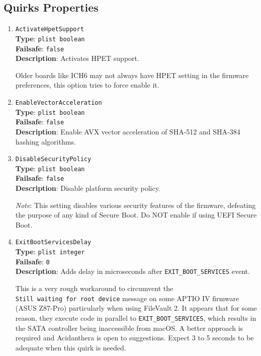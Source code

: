 \documentclass[]{article}
\begin{document}
\subsection{Quirks Properties}\label{uefiquirkprops}

\begin{enumerate}

\item
  \texttt{ActivateHpetSupport}\\
  \textbf{Type}: \texttt{plist\ boolean}\\
  \textbf{Failsafe}: \texttt{false}\\
  \textbf{Description}: Activates HPET support.

  Older boards like ICH6 may not always have HPET setting in the firmware preferences,
  this option tries to force enable it.

  \item
  \texttt{EnableVectorAcceleration}\\
  \textbf{Type}: \texttt{plist\ boolean}\\
  \textbf{Failsafe}: \texttt{false}\\
  \textbf{Description}: Enable AVX vector acceleration of SHA-512 and SHA-384 hashing algorithms.

  \item
  \texttt{DisableSecurityPolicy}\\
  \textbf{Type}: \texttt{plist\ boolean}\\
  \textbf{Failsafe}: \texttt{false}\\
  \textbf{Description}: Disable platform security policy.

  \emph{Note}: This setting disables various security features of the firmware,
  defeating the purpose of any kind of Secure Boot. Do NOT enable if using
  UEFI Secure Boot.

\item
  \texttt{ExitBootServicesDelay}\\
  \textbf{Type}: \texttt{plist\ integer}\\
  \textbf{Failsafe}: \texttt{0}\\
  \textbf{Description}: Adds delay in microseconds after \texttt{EXIT\_BOOT\_SERVICES}
  event.

  This is a very rough workaround to circumvent the \texttt{Still\ waiting\ for\ root\ device} message
  on some APTIO IV firmware (ASUS Z87-Pro) particularly when using FileVault 2.
  It appears that for some reason, they execute code in parallel to \texttt{EXIT\_BOOT\_SERVICES},
  which results in the SATA controller being inaccessible from macOS. A better approach is required
  and Acidanthera is open to suggestions. Expect 3 to 5 seconds to be adequate when this quirk is needed.


\end{enumerate}
\end{document}
